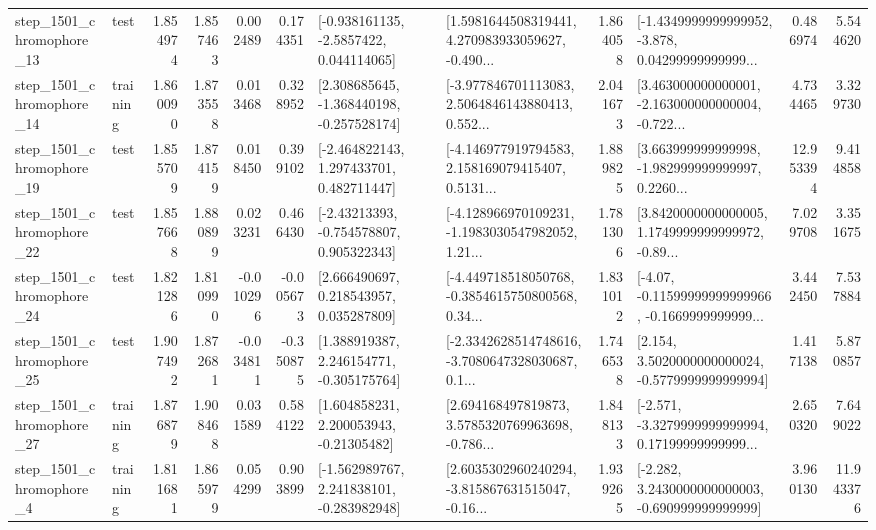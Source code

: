 \begin{tabular}{llrrrrllrlrr}
 step\_1501\_chromophore\_13 &      test &      1.854974 &    1.857463 &      0.002489 &  0.174351 &     [-0.938161135, -2.5857422, 0.044114065] &  [1.5981644508319441, 4.270983933059627, -0.490... &       1.864058 &  [-1.4349999999999952, -3.878, 0.04299999999999... &            0.486974 &          5.544620 \\
 step\_1501\_chromophore\_14 &  training &      1.860090 &    1.873558 &      0.013468 &  0.328952 &   [2.308685645, -1.368440198, -0.257528174] &  [-3.977846701113083, 2.5064846143880413, 0.552... &       2.041673 &  [3.463000000000001, -2.163000000000004, -0.722... &            4.734465 &          3.329730 \\
 step\_1501\_chromophore\_19 &      test &      1.855709 &    1.874159 &      0.018450 &  0.399102 &    [-2.464822143, 1.297433701, 0.482711447] &  [-4.146977919794583, 2.158169079415407, 0.5131... &       1.889825 &  [3.663999999999998, -1.982999999999997, 0.2260... &           12.953394 &          9.414858 \\
 step\_1501\_chromophore\_22 &      test &      1.857668 &    1.880899 &      0.023231 &  0.466430 &    [-2.43213393, -0.754578807, 0.905322343] &  [-4.128966970109231, -1.1983030547982052, 1.21... &       1.781306 &  [3.8420000000000005, 1.1749999999999972, -0.89... &            7.029708 &          3.351675 \\
 step\_1501\_chromophore\_24 &      test &      1.821286 &    1.810990 &     -0.010296 & -0.005673 &     [2.666490697, 0.218543957, 0.035287809] &  [-4.449718518050768, -0.3854615750800568, 0.34... &       1.831012 &  [-4.07, -0.11599999999999966, -0.1669999999999... &            3.442450 &          7.537884 \\
 step\_1501\_chromophore\_25 &      test &      1.907492 &    1.872681 &     -0.034811 & -0.350875 &    [1.388919387, 2.246154771, -0.305175764] &  [-2.3342628514748616, -3.7080647328030687, 0.1... &       1.746538 &   [2.154, 3.5020000000000024, -0.5779999999999994] &            1.417138 &          5.870857 \\
 step\_1501\_chromophore\_27 &  training &      1.876879 &    1.908468 &      0.031589 &  0.584122 &     [1.604858231, 2.200053943, -0.21305482] &  [2.694168497819873, 3.5785320769963698, -0.786... &       1.848133 &  [-2.571, -3.3279999999999994, 0.17199999999999... &            2.650320 &          7.649022 \\
  step\_1501\_chromophore\_4 &  training &      1.811681 &    1.865979 &      0.054299 &  0.903899 &   [-1.562989767, 2.241838101, -0.283982948] &  [2.6035302960240294, -3.815867631515047, -0.16... &       1.939265 &   [-2.282, 3.2430000000000003, -0.690999999999999] &            3.960130 &         11.943376 \\

\end{tabular}
